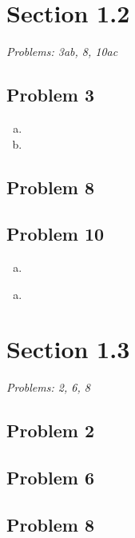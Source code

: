 \documentclass[12pt]{article}
\begin{document}

\section*{Section 1.2}
\textit{Problems: 3ab, 8, 10ac }

\subsection*{Problem 3}
\begin{enumerate}[a).]
    \item {

    }
    \item {

    }

\end{enumerate}

\subsection*{Problem 8}

\subsection*{Problem 10}
\begin{enumerate}[a).]
    \item {

    }

\end{enumerate}

\begin{enumerate}[c).]
    \item {

    }
\end{enumerate}


\vspace*{1cm}


\section*{Section 1.3}
\textit{Problems: 2, 6, 8}

\subsection*{Problem 2}

\subsection*{Problem 6}

\subsection*{Problem 8}
\end{document}
